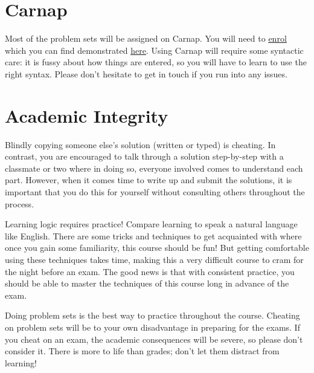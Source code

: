 \documentclass[letterpaper]{inzane_syllabus} %
\begin{document}
\vspace{0.5cm}
\section{Carnap}

Most of the problem sets will be assigned on Carnap.
You will need to \href{https://carnap.io/enroll/Logic%20I}{\underline{enrol}} which you can find demonstrated \href{https://youtu.be/lmkWcxqxEZk}{\underline{here}}.
Using Carnap will require some syntactic care: it is fussy about how things are entered, so you will have to learn to use the right syntax.
Please don't hesitate to get in touch if you run into any issues.


\newpage %

\makeSide %


\vspace{0.5cm}
\section{Academic Integrity}

Blindly copying someone else’s solution (written or typed) is cheating.
In contrast, you are encouraged to talk through a solution step-by-step with a classmate or two where in doing so, everyone involved comes to understand each part.
However, when it comes time to write up and submit the solutions, it is important that you do this for yourself without consulting others throughout the process.

Learning logic requires practice! 
Compare learning to speak a natural language like English. %
There are some tricks and techniques to get acquainted with where once you gain some familiarity, this course should be fun!
But getting comfortable using these techniques takes time, making this a very difficult course to cram for the night before an exam.
The good news is that with consistent practice, you should be able to master the techniques of this course long in advance of the exam.

Doing problem sets is the best way to practice throughout the course.
Cheating on problem sets will be to your own disadvantage in preparing for the exams.
If you cheat on an exam, the academic consequences will be severe, so please don't consider it.
There is more to life than grades; don't let them distract from learning!
\end{document}
